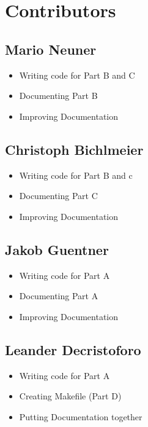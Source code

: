 \documentclass[12pt,a4paper]{article}
\begin{document}
\newpage


\section{Contributors}
\vspace{1cm}

\subsection*{\small Mario Neuner} 
\begin{itemize}
    \item Writing code for Part B and C
    \item Documenting Part B
    \item Improving Documentation
\end{itemize}

\vspace{1cm}

\subsection*{\small Christoph Bichlmeier}
\begin{itemize}
    \item Writing code for Part B and c
    \item Documenting Part C
    \item Improving Documentation
\end{itemize}

\vspace{1cm}

\subsection*{\small Jakob Guentner}
\begin{itemize}
    \item Writing code for Part A
    \item Documenting Part A
    \item Improving Documentation
\end{itemize}

\vspace{1cm}

\subsection*{\small Leander Decristoforo}
\begin{itemize}
    \item Writing code for Part A
    \item Creating Makefile (Part D)
    \item Putting Documentation together
\end{itemize}
\end{document}
